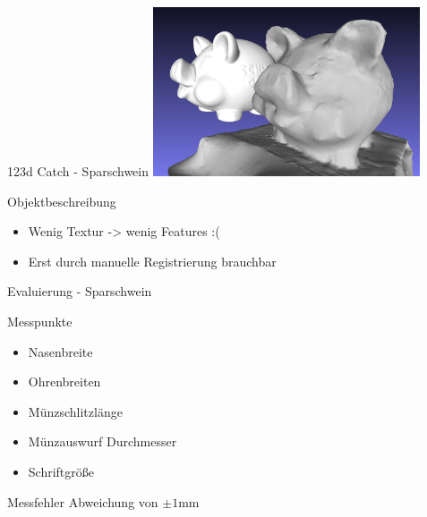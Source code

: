 \documentclass[11pt]{beamer}
\begin{document}
\begin{frame}{123d Catch - Sparschwein}
\center
	\includegraphics[height=5cm]{images/sparschwein/123d_Vergleich}
	\begin{block}{Objektbeschreibung}
		\begin{itemize}
			\item Wenig Textur -> wenig Features :(
			\item Erst durch manuelle Registrierung brauchbar
		\end{itemize}
	\end{block}
\end{frame}

\begin{frame}{Evaluierung - Sparschwein}
	\begin{block}{Messpunkte}
		\begin{itemize}
			\item Nasenbreite
			\item Ohrenbreiten
			\item Münzschlitzlänge
			\item Münzauswurf Durchmesser
			\item Schriftgröße
		\end{itemize}
	\end{block}
	\begin{block}{Messfehler}
		Abweichung von $\pm1$mm
	\end{block}
\end{frame}
\end{document}
